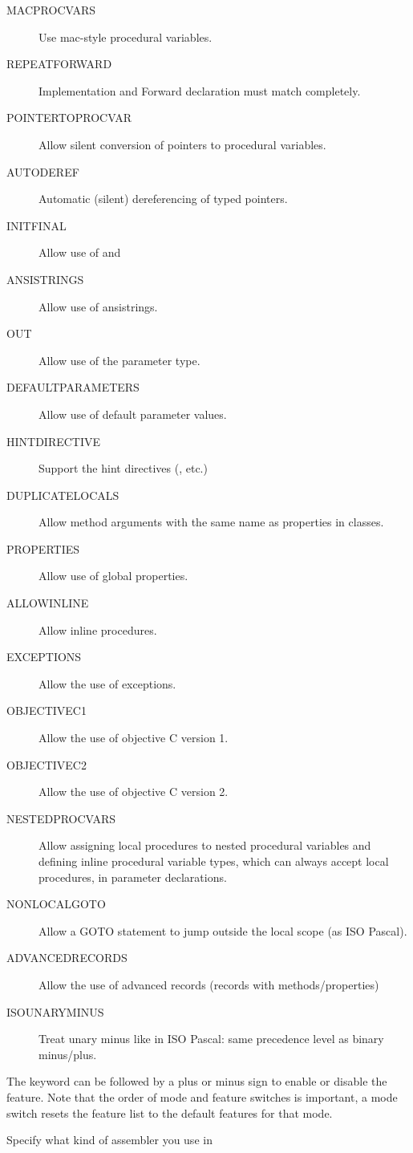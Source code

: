 \begin{description}
\begin{description}
\item[MACPROCVARS] Use mac-style procedural variables.
\item[REPEATFORWARD] Implementation and Forward declaration must match completely.
\item[POINTERTOPROCVAR] Allow silent conversion of pointers to procedural
variables.
\item[AUTODEREF] Automatic (silent) dereferencing of typed pointers.
\item[INITFINAL] Allow use of  and 
\item[ANSISTRINGS] Allow use of ansistrings.
\item[OUT] Allow use of the  parameter type.
\item[DEFAULTPARAMETERS] Allow use of default parameter values.
\item[HINTDIRECTIVE] Support the hint directives (,  etc.)
\item[DUPLICATELOCALS] Allow method arguments with the same name as properties in classes.
\item[PROPERTIES] Allow use of global properties.
\item[ALLOWINLINE] Allow inline procedures.
\item[EXCEPTIONS] Allow the use of exceptions.
\item[OBJECTIVEC1] Allow the use of objective C version 1.
\item[OBJECTIVEC2] Allow the use of objective C version 2.
\item[NESTEDPROCVARS] Allow assigning local procedures to nested procedural variables and defining inline procedural variable types, which can always accept local procedures, in parameter declarations.
\item[NONLOCALGOTO] Allow a GOTO statement to jump outside the local scope (as ISO Pascal).
\item[ADVANCEDRECORDS] Allow the use of advanced records (records with methods/properties)
\item[ISOUNARYMINUS] Treat unary minus like in ISO Pascal: same precedence level as binary minus/plus.
\end{description}
The keyword can be followed by a plus or minus sign to enable or disable the
feature. Note that the order of mode and feature switches is important, a
mode switch resets the feature list to the default features for that mode.
\item [-Rxxx]  Specify what kind of assembler you use in

\end{description}
